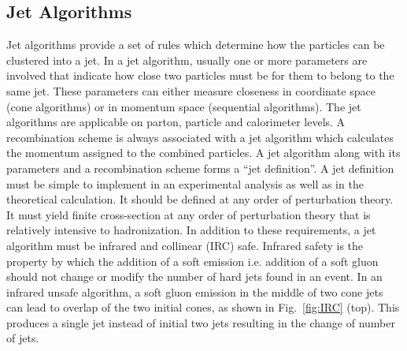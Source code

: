 \subsection{Jet Algorithms}
\label{sec:jet_algos}
Jet algorithms \cite{Salam:2009jx} provide a set of rules which determine how the particles can be clustered into a jet. In a jet algorithm, usually one or more parameters are involved that indicate how close two particles must be for them to belong to the same jet. These parameters can either measure closeness in coordinate space (cone algorithms) or in momentum space (sequential algorithms). The jet algorithms are applicable on parton, particle and calorimeter levels. A recombination scheme is always associated with a jet algorithm which calculates the momentum assigned to the combined particles. A jet algorithm along with its parameters and a recombination scheme forms a ``jet definition''. A jet definition \cite{Ellis:1989vm} must be simple to implement in an experimental analysis as well as in the theoretical calculation. It should be defined at any order of perturbation theory. It must yield finite cross-section at any order of perturbation theory that is relatively intensive to hadronization. In addition to these requirements, a jet algorithm must be infrared and collinear (IRC) safe. Infrared safety is the property by which the addition of a soft emission i.e. addition of a soft gluon should not change or modify the number of hard jets found in an event. In an infrared unsafe algorithm, a soft gluon emission in the middle of two cone jets can lead to overlap of the two initial cones, as shown in Fig.~\ref{fig:IRC} (top). This produces a single jet instead of initial two jets resulting in the change of number of jets. 
